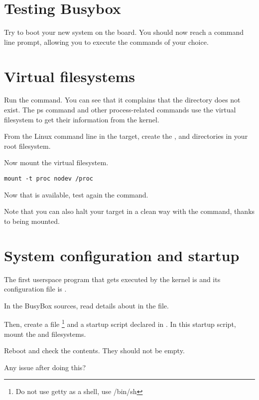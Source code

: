 \section{Testing Busybox}

Try to boot your new system on the board. You should now reach a 
command line prompt, allowing you to execute the commands of your
choice.

\section{Virtual filesystems}

Run the  command. You can see that it complains that the
 directory does not exist. The ps command and other
process-related commands use the  virtual filesystem to get
their information from the kernel.

From the Linux command line in the target, create the ,  and
 directories in your root filesystem.

Now mount the  virtual filesystem.

\begin{verbatim}
mount -t proc nodev /proc
\end{verbatim}

 Now that  is
available, test again the  command.

Note that you can also halt your target in a clean way with the 
command, thanks to  being mounted.

\section{System configuration and startup}

The first userspace program that gets executed by the kernel is
 and its configuration file is .

In the BusyBox sources, read details about  in the
 file.

Then, create a  file \footnote{Do not use getty as a shell, use /bin/sh}
and a  startup script declared in . In this startup
script, mount the  and  filesystems.


Reboot and check the contents. They should not be empty.


Any issue after doing this?

